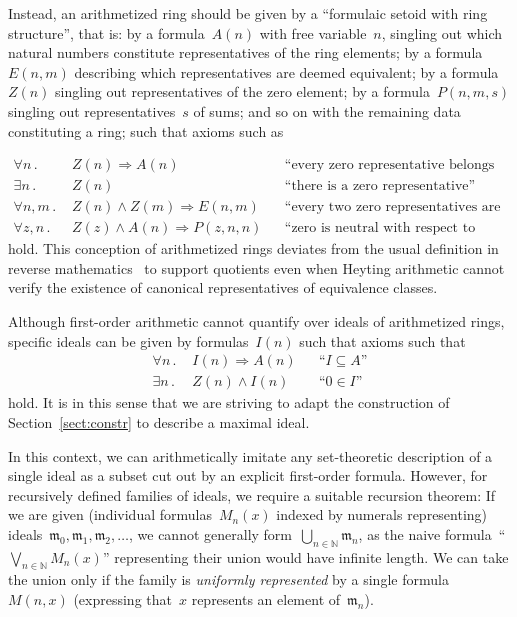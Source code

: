 \documentclass[envcountsect,envcountsame,runningheads]{llncs}
\newcommand{\mmm}{\mathfrak{m}}
\newcommand{\NN}{\mathbb{N}}
\renewcommand{\_}{\mathpunct{.}\,}
\begin{document}
Instead, an arithmetized ring should be given by a ``formulaic setoid with ring
structure'', that is: by a formula~$A(n)$ with free
variable~$n$, singling out which natural numbers constitute
representatives of the ring elements; by a formula~$E(n,m)$ describing which
representatives are deemed equivalent; by a formula~$Z(n)$ singling out
representatives of the zero element; by a formula~$P(n,m,s)$ singling out
representatives~$s$ of sums; and so on with the remaining data constituting
a ring; such that axioms such as\par
{\vspace*{-1.2em}\small\begin{align*}
  \forall n\_ & Z(n) \Rightarrow A(n) && \text{``every zero representative belongs to the ring''} \\
  \exists n\_ & Z(n) && \text{``there is a zero representative''} \\
  \forall n,m\_ & Z(n) \wedge Z(m) \Longrightarrow E(n,m) && \text{``every two zero representatives are equivalent''} \\
  \forall z,n\_ & Z(z) \wedge A(n) \Longrightarrow P(z,n,n) && \text{``zero is neutral with respect to addition''}
\end{align*}}%
hold. This conception of arithmetized rings deviates from the usual definition
in reverse mathematics~\cite[Definition~III.5.1]{simpson:subsystems} to support
quotients even when Heyting arithmetic cannot verify the existence of
canonical representatives of equivalence classes.

Although first-order arithmetic cannot quantify over ideals of arithmetized
rings, specific ideals can be given by formulas~$I(n)$ such that axioms such that
{\small\begin{align*}
  \forall n\_ & I(n) \Rightarrow A(n) && \text{``$I \subseteq A$''} \\
  \exists n\_ & Z(n) \wedge I(n) && \text{``$0 \in I$''}
\end{align*}}%
hold. It is in this sense that we are striving to adapt the construction of
Section~\ref{sect:constr} to describe a maximal ideal.

In this context, we can arithmetically imitate any set-theoretic description of
a single ideal as a subset cut out by an explicit first-order formula. However, for
recursively defined families of ideals, we require a suitable recursion
theorem: If we are given (individual formulas~$M_n(x)$ indexed by numerals
representing) ideals~$\mmm_0,\mmm_1,\mmm_2,\ldots$, we cannot generally
form~$\bigcup_{n\in\NN} \mmm_n$, as the naive formula~``$\bigvee_{n\in\NN} M_n(x)$''
representing their union would have infinite length. We can take the union only
if the family is \emph{uniformly represented} by a single formula~$M(n,x)$ (expressing
that~$x$ represents an element of~$\mmm_n$).
\end{document}
